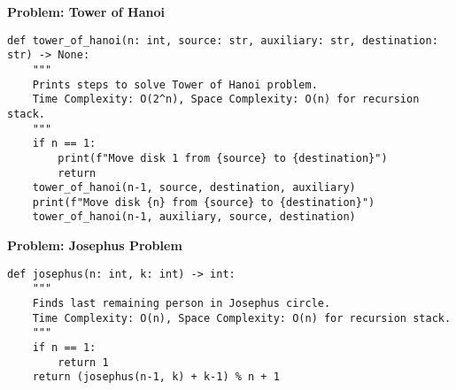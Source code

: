 \noindent\textbf{Problem: Tower of Hanoi}
\begin{verbatim}
def tower_of_hanoi(n: int, source: str, auxiliary: str, destination: str) -> None:
    """
    Prints steps to solve Tower of Hanoi problem.
    Time Complexity: O(2^n), Space Complexity: O(n) for recursion stack.
    """
    if n == 1:
        print(f"Move disk 1 from {source} to {destination}")
        return
    tower_of_hanoi(n-1, source, destination, auxiliary)
    print(f"Move disk {n} from {source} to {destination}")
    tower_of_hanoi(n-1, auxiliary, source, destination)
\end{verbatim}

\noindent\textbf{Problem: Josephus Problem}
\begin{verbatim}
def josephus(n: int, k: int) -> int:
    """
    Finds last remaining person in Josephus circle.
    Time Complexity: O(n), Space Complexity: O(n) for recursion stack.
    """
    if n == 1:
        return 1
    return (josephus(n-1, k) + k-1) % n + 1
\end{verbatim}


